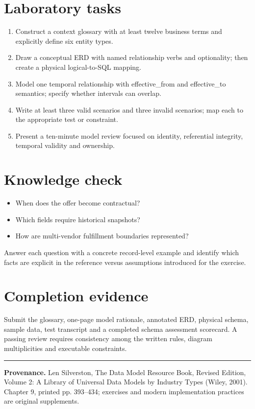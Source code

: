 \documentclass[11pt,letterpaper]{article}
\begin{document}
\section{Laboratory tasks}
\begin{enumerate}
\item Construct a context glossary with at least twelve business terms and explicitly define six entity types.
\item Draw a conceptual ERD with named relationship verbs and optionality; then create a physical logical-to-SQL mapping.
\item Model one temporal relationship with effective\_from and effective\_to semantics; specify whether intervals can overlap.
\item Write at least three valid scenarios and three invalid scenarios; map each to the appropriate test or constraint.
\item Present a ten-minute model review focused on identity, referential integrity, temporal validity and ownership.
\end{enumerate}

\section{Knowledge check}
\begin{itemize}
\item When does the offer become contractual?
\item Which fields require historical snapshots?
\item How are multi-vendor fulfillment boundaries represented?
\end{itemize}
Answer each question with a concrete record-level example and identify which facts are explicit in the reference versus assumptions introduced for the exercise.


\section{Completion evidence}
Submit the glossary, one-page model rationale, annotated ERD, physical schema, sample data, test transcript and a completed schema assessment scorecard. A passing review requires consistency among the written rules, diagram multiplicities and executable constraints.


\vfill
\hrule
{\footnotesize\textbf{Provenance.} Len Silverston, The Data Model Resource Book, Revised Edition, Volume 2: A Library of Universal Data Models by Industry Types (Wiley, 2001). Chapter 9, printed pp. 393--434; exercises and modern implementation practices are original supplements.}
\end{document}
